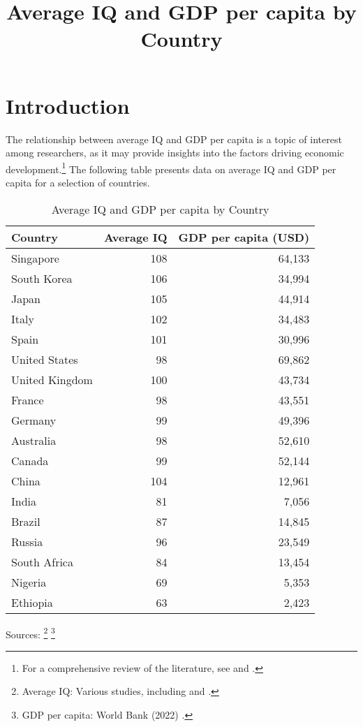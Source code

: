 \documentclass{article}
\begin{document}
\title{Average IQ and GDP per capita by Country}
\author{}
\date{}
\maketitle

\section{Introduction}

The relationship between average IQ and GDP per capita is a topic of interest among researchers, as it may provide insights into the factors driving economic development.\footnote{For a comprehensive review of the literature, see \cite{LynnVanhanen2012} and \cite{Rindermann2018}.} The following table presents data on average IQ and GDP per capita for a selection of countries.

\begin{table}[h!]
\centering
\begin{tabular}{lrr}
\toprule
Country & Average IQ & GDP per capita (USD) \\
\midrule
Singapore & 108 & 64,133 \\
South Korea & 106 & 34,994 \\
Japan & 105 & 44,914 \\
Italy & 102 & 34,483 \\
Spain & 101 & 30,996 \\
United States & 98 & 69,862 \\
United Kingdom & 100 & 43,734 \\
France & 98 & 43,551 \\
Germany & 99 & 49,396 \\
Australia & 98 & 52,610 \\
Canada & 99 & 52,144 \\
China & 104 & 12,961 \\
India & 81 & 7,056 \\
Brazil & 87 & 14,845 \\
Russia & 96 & 23,549 \\
South Africa & 84 & 13,454 \\
Nigeria & 69 & 5,353 \\
Ethiopia & 63 & 2,423 \\
\bottomrule
\end{tabular}
\caption{Average IQ and GDP per capita by Country}
\label{tab:iq_gdp}
\end{table}

Sources:
\footnote{Average IQ: Various studies, including \cite{LynnVanhanen2012} and \cite{Rindermann2018}.}
\footnote{GDP per capita: World Bank (2022) \cite{WorldBank2022}.}
\end{document}
